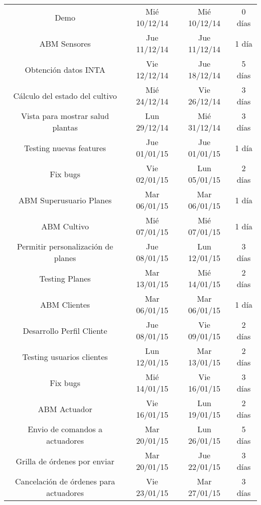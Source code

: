 \begin{landscape}
\begin{table}[ht]
\begin{tabular}{c c c c}
Demo                                                        & Mié 10/12/14    & Mié 10/12/14 & 0 días   \\
ABM Sensores                                                & Jue 11/12/14    & Jue 11/12/14 & 1 día    \\
Obtención datos INTA                                        & Vie 12/12/14    & Jue 18/12/14 & 5 días   \\
Cálculo del estado del cultivo                              & Mié 24/12/14    & Vie 26/12/14 & 3 días   \\
Vista para mostrar salud plantas                            & Lun 29/12/14    & Mié 31/12/14 & 3 días   \\
Testing nuevas features                                     & Jue 01/01/15    & Jue 01/01/15 & 1 día    \\
Fix bugs                                                    & Vie 02/01/15    & Lun 05/01/15 & 2 días   \\
ABM Superusuario Planes                                     & Mar 06/01/15    & Mar 06/01/15 & 1 día    \\
ABM Cultivo                                                 & Mié 07/01/15    & Mié 07/01/15 & 1 día    \\
Permitir personalización de planes                          & Jue 08/01/15    & Lun 12/01/15 & 3 días   \\
Testing Planes                                              & Mar 13/01/15    & Mié 14/01/15 & 2 días   \\
ABM Clientes                                                & Mar 06/01/15    & Mar 06/01/15 & 1 día    \\
Desarrollo Perfil Cliente                                   & Jue 08/01/15    & Vie 09/01/15 & 2 días   \\
Testing usuarios clientes                                   & Lun 12/01/15    & Mar 13/01/15 & 2 días   \\
Fix bugs                                                    & Mié 14/01/15    & Vie 16/01/15 & 3 días   \\
ABM Actuador                                                & Vie 16/01/15    & Lun 19/01/15 & 2 días   \\
Envio de comandos a actuadores                              & Mar 20/01/15    & Lun 26/01/15 & 5 días   \\
Grilla de órdenes por enviar                                & Mar 20/01/15    & Jue 22/01/15 & 3 días   \\
Cancelación de órdenes para actuadores                      & Vie 23/01/15    & Mar 27/01/15 & 3 días   \\
\end{tabular}
\end{table}
\end{landscape}


